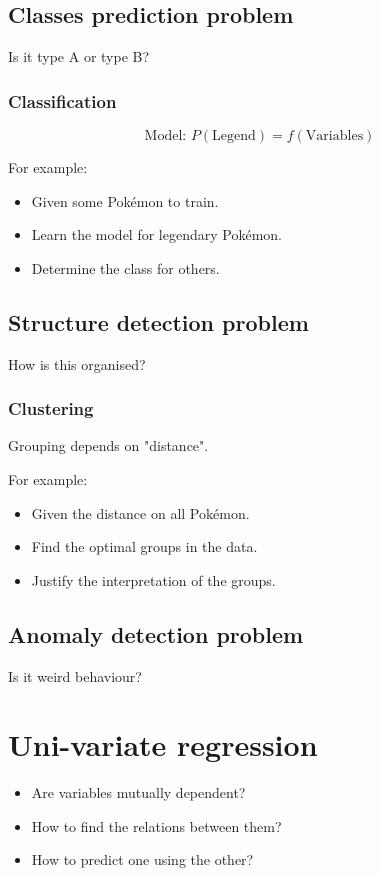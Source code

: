 \documentclass[11pt]{article}
\begin{document}
\subsection{Classes prediction problem}
\label{sec:orgaf146d5}
Is it type A or type B?
\subsubsection{Classification}
\label{sec:org0bee356}
\[\text{Model: } P (\text{Legend}) = f(\text{Variables})\]

For example:
\begin{itemize}
\item Given some Pokémon to train.
\item Learn the model for legendary Pokémon.
\item Determine the class for others.
\end{itemize}
\subsection{Structure detection problem}
\label{sec:orgd88882b}
How is this organised?
\subsubsection{Clustering}
\label{sec:orgf167c23}
Grouping depends on "distance".

For example:
\begin{itemize}
\item Given the distance on all Pokémon.
\item Find the optimal groups in the data.
\item Justify the interpretation of the groups.
\end{itemize}
\subsection{Anomaly detection problem}
\label{sec:org6ed3592}
Is it weird behaviour?

 \newpage
\section{Uni-variate regression}
\label{sec:orgd2431e4}
\begin{itemize}
\item Are variables mutually dependent?
\item How to find the relations between them?
\item How to predict one using the other?
\end{itemize}
\end{document}
